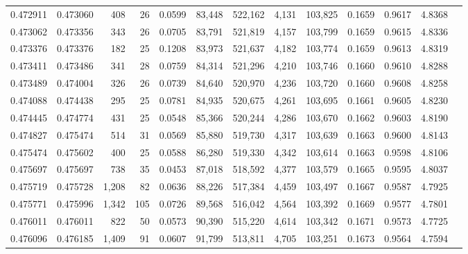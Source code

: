 \begin{tabular}{rrrrrrrrrrrrr}
0.472911 & 0.473060 &   408 &    26 &                                     0.0599 &  83,448 & 522,162 &   4,131 & 103,825 & 0.1659 & 0.9617 & 4.8368 \\
0.473062 & 0.473356 &   343 &    26 &                                     0.0705 &  83,791 & 521,819 &   4,157 & 103,799 & 0.1659 & 0.9615 & 4.8336 \\
0.473376 & 0.473376 &   182 &    25 &                                     0.1208 &  83,973 & 521,637 &   4,182 & 103,774 & 0.1659 & 0.9613 & 4.8319 \\
0.473411 & 0.473486 &   341 &    28 &                                     0.0759 &  84,314 & 521,296 &   4,210 & 103,746 & 0.1660 & 0.9610 & 4.8288 \\
0.473489 & 0.474004 &   326 &    26 &                                     0.0739 &  84,640 & 520,970 &   4,236 & 103,720 & 0.1660 & 0.9608 & 4.8258 \\
0.474088 & 0.474438 &   295 &    25 &                                     0.0781 &  84,935 & 520,675 &   4,261 & 103,695 & 0.1661 & 0.9605 & 4.8230 \\
0.474445 & 0.474774 &   431 &    25 &                                     0.0548 &  85,366 & 520,244 &   4,286 & 103,670 & 0.1662 & 0.9603 & 4.8190 \\
0.474827 & 0.475474 &   514 &    31 &                                     0.0569 &  85,880 & 519,730 &   4,317 & 103,639 & 0.1663 & 0.9600 & 4.8143 \\
0.475474 & 0.475602 &   400 &    25 &                                     0.0588 &  86,280 & 519,330 &   4,342 & 103,614 & 0.1663 & 0.9598 & 4.8106 \\
0.475697 & 0.475697 &   738 &    35 &                                     0.0453 &  87,018 & 518,592 &   4,377 & 103,579 & 0.1665 & 0.9595 & 4.8037 \\
0.475719 & 0.475728 & 1,208 &    82 &                                     0.0636 &  88,226 & 517,384 &   4,459 & 103,497 & 0.1667 & 0.9587 & 4.7925 \\
0.475771 & 0.475996 & 1,342 &   105 &                                     0.0726 &  89,568 & 516,042 &   4,564 & 103,392 & 0.1669 & 0.9577 & 4.7801 \\
0.476011 & 0.476011 &   822 &    50 &                                     0.0573 &  90,390 & 515,220 &   4,614 & 103,342 & 0.1671 & 0.9573 & 4.7725 \\
0.476096 & 0.476185 & 1,409 &    91 &                                     0.0607 &  91,799 & 513,811 &   4,705 & 103,251 & 0.1673 & 0.9564 & 4.7594 \\

\end{tabular}
